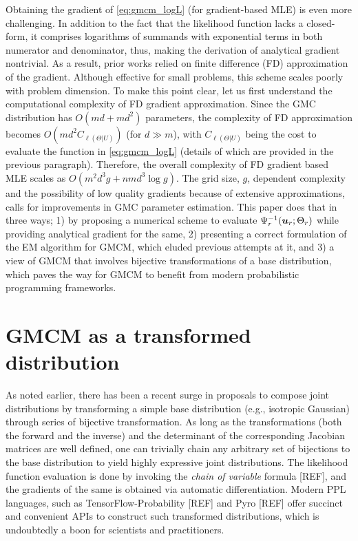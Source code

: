 \documentclass{article}
\theoremstyle{plain}
\theoremstyle{definition}
\theoremstyle{remark}
\begin{document}
 

Obtaining the gradient of \eqref{eq:gmcm_logL} (for gradient-based MLE) is even more challenging. In addition to the fact that the likelihood function lacks a closed-form, it comprises logarithms of summands with exponential terms in both numerator and denominator, thus, making the derivation of analytical gradient nontrivial. As a result, prior works \citep{Tewari2011, Bilgrau2016} relied on finite difference (FD) approximation of the gradient. Although effective for small problems, this scheme scales poorly with problem dimension. To make this point clear, let us first understand the computational complexity of FD gradient approximation. Since the GMC distribution has $O(md+md^2)$ parameters, the complexity of FD approximation becomes $O(md^2C_{\ell(\Theta|U)})$ (for $d\gg m$), with $C_{\ell(\Theta|U)}$ being the cost to evaluate the function in  \eqref{eq:gmcm_logL} (details of which are provided in the previous paragraph).  Therefore, the overall complexity of FD gradient based MLE scales as $O(m^2d^3g+nmd^3\log{g})$. The grid size, $g$, dependent complexity and the possibility of low quality gradients because of extensive approximations, calls for improvements in GMC parameter estimation. This paper does that in three ways; 1) by proposing a numerical scheme to evaluate $\Psi_r^{-1}(\boldsymbol{u}_r;\Theta_r)$ while providing analytical gradient for the same, 2) presenting a correct formulation of the EM algorithm for GMCM, which eluded previous attempts at it, and 3) a view of GMCM that involves bijective transformations of a base distribution, which paves the way for GMCM to benefit from modern probabilistic programming frameworks.

\section{GMCM as a transformed distribution}

As noted earlier, there has been a recent surge in proposals to compose joint distributions by transforming a simple base distribution (e.g., isotropic Gaussian) through series of bijective transformation. As long as the transformations (both the forward and the inverse) and the determinant of the corresponding Jacobian matrices are well defined, one can trivially chain any arbitrary set of bijections to the base distribution to yield highly expressive joint distributions. The likelihood function evaluation is done by invoking the \emph{chain of variable} formula [REF], and the gradients of the same is  obtained via automatic differentiation. Modern PPL languages, such as TensorFlow-Probability [REF] and Pyro [REF] offer succinct and convenient APIs to construct such transformed distributions, which is undoubtedly a boon for scientists and practitioners.
\end{document}
